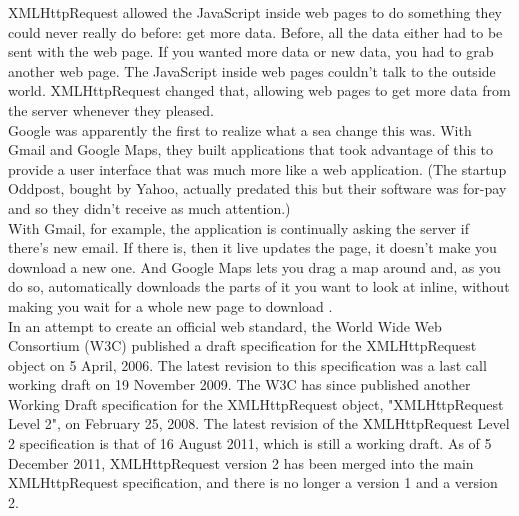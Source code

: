 XMLHttpRequest allowed the JavaScript inside web pages to do something they could never really do before: get more data. Before, all the data either had to be sent with the web page. If you wanted more data or new data, you had to grab another web page. The JavaScript inside web pages couldn’t talk to the outside world. XMLHttpRequest changed that, allowing web pages to get more data from the server whenever they pleased.\\

Google was apparently the first to realize what a sea change this was. With Gmail and Google Maps, they built applications that took advantage of this to provide a user interface that was much more like a web application. (The startup Oddpost, bought by Yahoo, actually predated this but their software was for-pay and so they didn’t receive as much attention.)\\

With Gmail, for example, the application is continually asking the server if there’s new email. If there is, then it live updates the page, it doesn’t make you download a new one. And Google Maps lets you drag a map around and, as you do so, automatically downloads the parts of it you want to look at inline, without making you wait for a whole new page to download \cite{swartz2005brief}.\\

In an attempt to create an official web standard, the World Wide Web Consortium (W3C) published a draft specification for the XMLHttpRequest object on 5 April, 2006. The latest revision to this specification was a last call working draft on 19 November 2009. The W3C has since published another Working Draft specification for the XMLHttpRequest object, "XMLHttpRequest Level 2", on February 25, 2008. The latest revision of the XMLHttpRequest Level 2 specification is that of 16 August 2011, which is still a working draft. As of 5 December 2011, XMLHttpRequest version 2 has been merged into the main XMLHttpRequest specification, and there is no longer a version 1 and a version 2.
		
